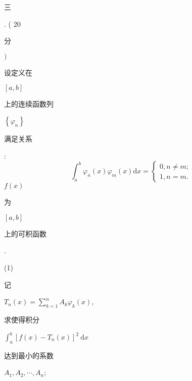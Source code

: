 \documentclass[10pt]{article}
\begin{document}
\begin{CJK}{UTF8}{mj}三\end{CJK}. ( 20 \begin{CJK}{UTF8}{mj}分\end{CJK} $)$ \begin{CJK}{UTF8}{mj}设定义在\end{CJK} $[a, b]$ \begin{CJK}{UTF8}{mj}上的连续函数列\end{CJK} $\left\{\varphi_{n}\right\}$ \begin{CJK}{UTF8}{mj}满足关系\end{CJK}:
$$
\int_{a}^{b} \varphi_{n}(x) \varphi_{m}(x) \mathrm{d} x=\left\{\begin{array}{l}
0, n \neq m ; \\
1, n=m .
\end{array}\right.
$$
$f(x)$ \begin{CJK}{UTF8}{mj}为\end{CJK} $[a, b]$ \begin{CJK}{UTF8}{mj}上的可积函数\end{CJK}.

(1) \begin{CJK}{UTF8}{mj}记\end{CJK} $T_{n}(x)=\sum_{k=1}^{n} A_{k} \varphi_{k}(x)$, \begin{CJK}{UTF8}{mj}求使得积分\end{CJK} $\int_{a}^{b}\left[f(x)-T_{n}(x)\right]^{2} \mathrm{~d} x$ \begin{CJK}{UTF8}{mj}达到最小的系数\end{CJK} $A_{1}, A_{2}, \cdots, A_{n}$;
\end{document}
